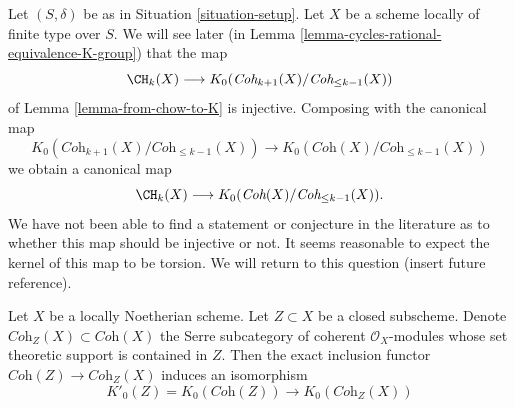 \begin{remark}
\label{remark-good-cases-K-A}
Let $(S, \delta)$ be as in Situation \ref{situation-setup}.
Let $X$ be a scheme locally of finite type over $S$.
We will see later (in Lemma \ref{lemma-cycles-rational-equivalence-K-group})
that the map
$$
\CH_k(X)
\longrightarrow
K_0(\textit{Coh}_{k + 1}(X)/\textit{Coh}_{\leq k - 1}(X))
$$
of Lemma \ref{lemma-from-chow-to-K} is injective.
Composing with the canonical map
$$
K_0(\textit{Coh}_{k + 1}(X)/\textit{Coh}_{\leq k - 1}(X))
\longrightarrow
K_0(\textit{Coh}(X)/\textit{Coh}_{\leq k - 1}(X))
$$
we obtain a canonical map
$$
\CH_k(X)
\longrightarrow
K_0(\textit{Coh}(X)/\textit{Coh}_{\leq k - 1}(X)).
$$
We have not been able to find a statement or conjecture in the
literature as to whether this map should be injective or not.
It seems reasonable to expect the kernel of this map to be torsion.
We will return to this question (insert future reference).
\end{remark}

\begin{lemma}
\label{lemma-K-coherent-supported-on-closed}
Let $X$ be a locally Noetherian scheme. Let $Z \subset X$ be a closed
subscheme. Denote $\textit{Coh}_Z(X) \subset \textit{Coh}(X)$
the Serre subcategory of coherent $\mathcal{O}_X$-modules whose
set theoretic support is contained in $Z$. Then the exact inclusion
functor $\textit{Coh}(Z) \to \textit{Coh}_Z(X)$ induces
an isomorphism
$$
K'_0(Z) = K_0(\textit{Coh}(Z)) \longrightarrow K_0(\textit{Coh}_Z(X))
$$
\end{lemma}

